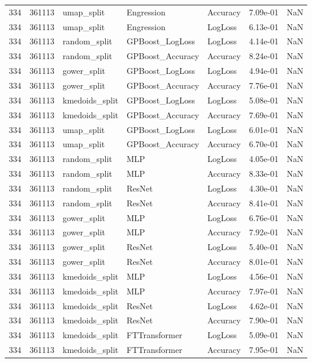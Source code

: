 \begin{tabular}{rrlllrr}
334 & 361113 & umap\_split & Engression & Accuracy & 7.09e-01 & NaN \\
334 & 361113 & umap\_split & Engression & LogLoss & 6.13e-01 & NaN \\
334 & 361113 & random\_split & GPBoost\_LogLoss & LogLoss & 4.14e-01 & NaN \\
334 & 361113 & random\_split & GPBoost\_Accuracy & Accuracy & 8.24e-01 & NaN \\
334 & 361113 & gower\_split & GPBoost\_LogLoss & LogLoss & 4.94e-01 & NaN \\
334 & 361113 & gower\_split & GPBoost\_Accuracy & Accuracy & 7.76e-01 & NaN \\
334 & 361113 & kmedoids\_split & GPBoost\_LogLoss & LogLoss & 5.08e-01 & NaN \\
334 & 361113 & kmedoids\_split & GPBoost\_Accuracy & Accuracy & 7.69e-01 & NaN \\
334 & 361113 & umap\_split & GPBoost\_LogLoss & LogLoss & 6.01e-01 & NaN \\
334 & 361113 & umap\_split & GPBoost\_Accuracy & Accuracy & 6.70e-01 & NaN \\
334 & 361113 & random\_split & MLP & LogLoss & 4.05e-01 & NaN \\
334 & 361113 & random\_split & MLP & Accuracy & 8.33e-01 & NaN \\
334 & 361113 & random\_split & ResNet & LogLoss & 4.30e-01 & NaN \\
334 & 361113 & random\_split & ResNet & Accuracy & 8.41e-01 & NaN \\
334 & 361113 & gower\_split & MLP & LogLoss & 6.76e-01 & NaN \\
334 & 361113 & gower\_split & MLP & Accuracy & 7.92e-01 & NaN \\
334 & 361113 & gower\_split & ResNet & LogLoss & 5.40e-01 & NaN \\
334 & 361113 & gower\_split & ResNet & Accuracy & 8.01e-01 & NaN \\
334 & 361113 & kmedoids\_split & MLP & LogLoss & 4.56e-01 & NaN \\
334 & 361113 & kmedoids\_split & MLP & Accuracy & 7.97e-01 & NaN \\
334 & 361113 & kmedoids\_split & ResNet & LogLoss & 4.62e-01 & NaN \\
334 & 361113 & kmedoids\_split & ResNet & Accuracy & 7.90e-01 & NaN \\
334 & 361113 & kmedoids\_split & FTTransformer & LogLoss & 5.09e-01 & NaN \\
334 & 361113 & kmedoids\_split & FTTransformer & Accuracy & 7.95e-01 & NaN \\

\end{tabular}
